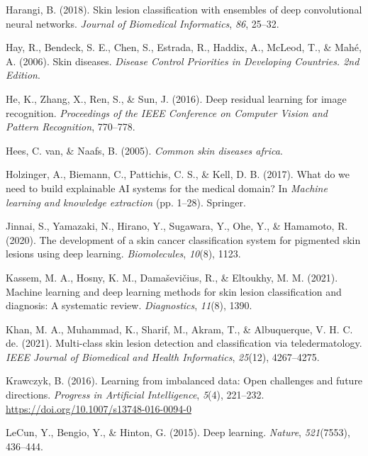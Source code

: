 \documentclass[
  12pt,
  oneside]{article}
\newlength{\cslhangindent}
\newenvironment{CSLReferences}[2] %
 {\begin{list}{}{%
  \setlength{\itemindent}{0pt}
  \setlength{\leftmargin}{0pt}
  \setlength{\parsep}{0pt}
  \ifodd #1
   \setlength{\leftmargin}{\cslhangindent}
   \setlength{\itemindent}{-1\cslhangindent}
  \fi
  \setlength{\itemsep}{#2\baselineskip}}}
 {\end{list}}
\begin{document}
\begin{CSLReferences}{1}{0}
Harangi, B. (2018). Skin lesion classification with ensembles of deep
convolutional neural networks. \emph{Journal of Biomedical Informatics},
\emph{86}, 25--32.

Hay, R., Bendeck, S. E., Chen, S., Estrada, R., Haddix, A., McLeod, T.,
\& Mahé, A. (2006). Skin diseases. \emph{Disease Control Priorities in
Developing Countries. 2nd Edition}.

He, K., Zhang, X., Ren, S., \& Sun, J. (2016). Deep residual learning
for image recognition. \emph{Proceedings of the IEEE Conference on
Computer Vision and Pattern Recognition}, 770--778.

Hees, C. van, \& Naafs, B. (2005). \emph{Common skin diseases africa}.

Holzinger, A., Biemann, C., Pattichis, C. S., \& Kell, D. B. (2017).
What do we need to build explainable AI systems for the medical domain?
In \emph{Machine learning and knowledge extraction} (pp. 1--28).
Springer.

Jinnai, S., Yamazaki, N., Hirano, Y., Sugawara, Y., Ohe, Y., \&
Hamamoto, R. (2020). The development of a skin cancer classification
system for pigmented skin lesions using deep learning.
\emph{Biomolecules}, \emph{10}(8), 1123.

Kassem, M. A., Hosny, K. M., Damaševičius, R., \& Eltoukhy, M. M.
(2021). Machine learning and deep learning methods for skin lesion
classification and diagnosis: A systematic review. \emph{Diagnostics},
\emph{11}(8), 1390.

Khan, M. A., Muhammad, K., Sharif, M., Akram, T., \& Albuquerque, V. H.
C. de. (2021). Multi-class skin lesion detection and classification via
teledermatology. \emph{IEEE Journal of Biomedical and Health
Informatics}, \emph{25}(12), 4267--4275.

Krawczyk, B. (2016). Learning from imbalanced data: Open challenges and
future directions. \emph{Progress in Artificial Intelligence},
\emph{5}(4), 221--232. \url{https://doi.org/10.1007/s13748-016-0094-0}

LeCun, Y., Bengio, Y., \& Hinton, G. (2015). Deep learning.
\emph{Nature}, \emph{521}(7553), 436--444.


\end{CSLReferences}
\end{document}
